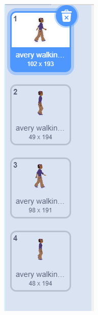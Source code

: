 \documentclass[10pt, a4paper]{article}
\begin{document}
\begin{enumerate}
        \begin{figure}[htbp]
            \centering
            \begin{minipage}[t]{.58\textwidth}
                \centering
                \begin{minipage}[t]{.13\textwidth}
                    \centering
                    \includegraphics[width=\textwidth]{19-1.png}

\end{minipage}
\end{minipage}
\end{figure}
\end{enumerate}
\end{document}
